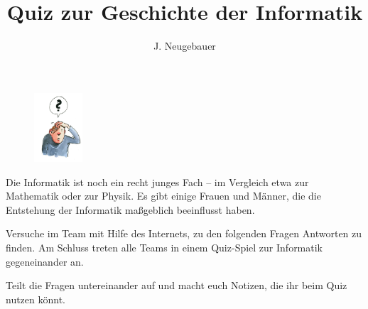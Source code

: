 \documentclass[10pt, a4paper]{scrartcl}
\author{J. Neugebauer}
\title{Quiz zur Geschichte der Informatik}
\date{\Heute}
\begin{document}
\ReiheTitel

\begin{figure}
\includegraphics[width=1.8cm]{9Diff-AB.1-Abb-1}
\end{figure}
Die Informatik ist noch ein recht junges Fach – im Vergleich etwa zur Mathematik oder zur Physik. 
Es gibt einige Frauen und Männer, die die Entstehung der Informatik maßgeblich beeinflusst haben.


Versuche im Team mit Hilfe des Internets, zu den folgenden Fragen Antworten zu finden. Am Schluss treten
alle Teams in einem Quiz-Spiel zur Informatik gegeneinander an.


Teilt die Fragen untereinander auf und macht euch Notizen, die ihr beim Quiz nutzen könnt.
\end{document}
